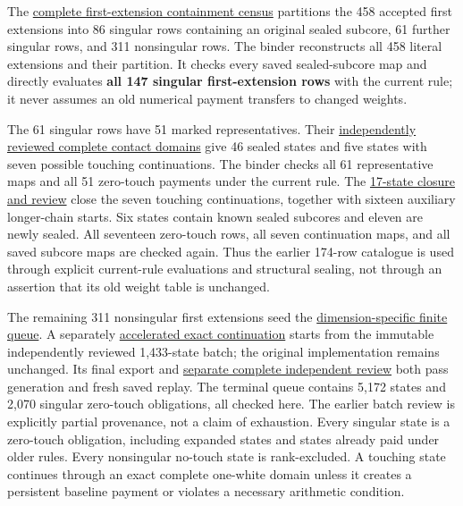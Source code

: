 \documentclass[
  10pt,
]{report}
\begin{document}
The
\href{fresh_sqrt5_sealed_subcore_closure_20261015_review.md}{complete
first-extension containment census} partitions the 458 accepted first
extensions into 86 singular rows containing an original sealed subcore,
61 further singular rows, and 311 nonsingular rows. The binder
reconstructs all 458 literal extensions and their partition. It checks
every saved sealed-subcore map and directly evaluates \textbf{all 147
singular first-extension rows} with the current rule; it never assumes
an old numerical payment transfers to changed weights.

The 61 singular rows have 51 marked representatives. Their
\href{fresh_sqrt5_extended_forest_weights_20261015_review.md}{independently
reviewed complete contact domains} give 46 sealed states and five states
with seven possible touching continuations. The binder checks all 61
representative maps and all 51 zero-touch payments under the current
rule. The
\href{fresh_sqrt5_singular_attachment_closure_20261015_review.md}{17-state
closure and review} close the seven touching continuations, together
with sixteen auxiliary longer-chain starts. Six states contain known
sealed subcores and eleven are newly sealed. All seventeen zero-touch
rows, all seven continuation maps, and all saved subcore maps are
checked again. Thus the earlier 174-row catalogue is used through
explicit current-rule evaluations and structural sealing, not through an
assertion that its old weight table is unchanged.

The remaining 311 nonsingular first extensions seed the
\href{fresh_sqrt5_nonsingular_rank29_exhaustion_20261015.md}{dimension-specific
finite queue}. A separately
\href{../scripts/fresh_sqrt5_nonsingular_rank29_fast_20261015.py}{accelerated
exact continuation} starts from the immutable independently reviewed
1,433-state batch; the original implementation remains unchanged. Its
final export and
\href{fresh_sqrt5_nonsingular_rank29_fast_20261015_review.md}{separate
complete independent review} both pass generation and fresh saved
replay. The terminal queue contains 5,172 states and 2,070 singular
zero-touch obligations, all checked here. The earlier batch review is
explicitly partial provenance, not a claim of exhaustion. Every singular
state is a zero-touch obligation, including expanded states and states
already paid under older rules. Every nonsingular no-touch state is
rank-excluded. A touching state continues through an exact complete
one-white domain unless it creates a persistent baseline payment or
violates a necessary arithmetic condition.
\end{document}
